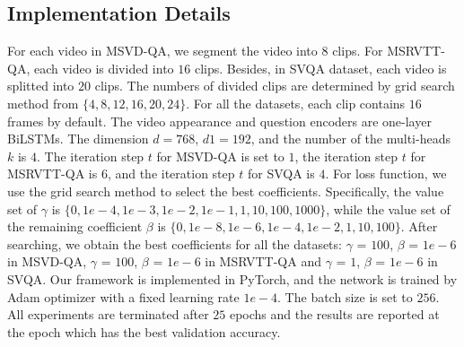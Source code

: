 \documentclass[journal]{IEEEtran}
\begin{document}
\subsection{Implementation Details}
For each video in MSVD-QA, we segment the video into $8$ clips. For MSRVTT-QA, each video is divided into $16$ clips. Besides, in SVQA dataset, each video is splitted into $20$ clips. The numbers of divided clips are determined by grid search method from $\{4,8,12,16,20,24\}$. For all the datasets, each clip contains $16$ frames by default. The video appearance and question encoders are one-layer BiLSTMs. The dimension $d=768$, $d1=192$, and the number of the multi-heads $k$ is $4$. The iteration step $t$ for MSVD-QA is set to $1$, the iteration step $t$ for MSRVTT-QA is $6$, and the iteration step $t$ for SVQA is $4$. For loss function, we use the grid search method to select the best coefficients. Specifically, the value set of $\gamma$ is $\{0,1e-4,1e-3,1e-2,1e-1,1,10,100,1000\}$, while the value set of the remaining coefficient $\beta$ is $\{0,1e-8,1e-6,1e-4,1e-2,1,10,100\}$. After searching, we obtain the best coefficients for all the datasets: $\gamma$ = $100$, $\beta$ = $1e-6$ in MSVD-QA, $\gamma$ = $100$, $\beta$ = $1e-6$ in MSRVTT-QA and $\gamma$ = $1$, $\beta$ = $1e-6$ in SVQA. Our framework is implemented in PyTorch, and the network is trained by Adam optimizer with a fixed learning rate $1e-4$. The batch size is set to $256$. All experiments are terminated after $25$ epochs and the results are reported at the epoch which has the best validation accuracy.
\end{document}
